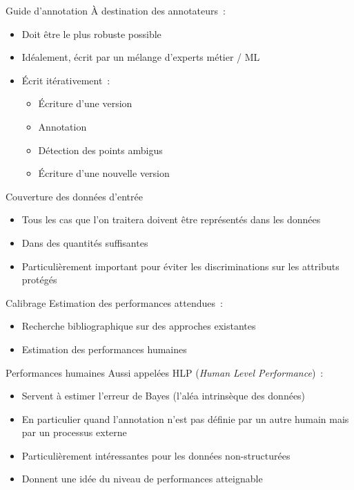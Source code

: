 \begin{frame}{Guide d'annotation}
  À destination des annotateurs~:
  \begin{itemize}
    \item Doit être le plus robuste possible
    \item Idéalement, écrit par un mélange d'experts métier / ML
    \item Écrit itérativement~:
      \begin{itemize}
        \item Écriture d'une version
        \item Annotation
        \item Détection des points ambigus
        \item Écriture d'une nouvelle version
      \end{itemize}
  \end{itemize}
\end{frame}

\begin{frame}{Couverture des données d'entrée}
  \begin{itemize}
    \item Tous les cas que l'on traitera doivent être représentés dans les données
    \item Dans des quantités suffisantes
    \item Particulièrement important pour éviter les discriminations sur les attributs protégés
  \end{itemize}
\end{frame}

\begin{frame}{Calibrage}
  Estimation des performances attendues~:

  \begin{itemize}
    \item Recherche bibliographique sur des approches existantes
    \item Estimation des performances humaines
  \end{itemize}
\end{frame}

\begin{frame}{Performances humaines}
  Aussi appelées HLP (\textit{Human Level Performance})~:

  \begin{itemize}
    \item Servent à estimer l'erreur de Bayes (l'aléa intrinsèque des données)
    \item En particulier quand l'annotation n'est pas définie par un autre humain mais par un processus externe
    \item Particulièrement intéressantes pour les données non-structurées
    \item Donnent une idée du niveau de performances atteignable
  \end{itemize}
\end{frame}

